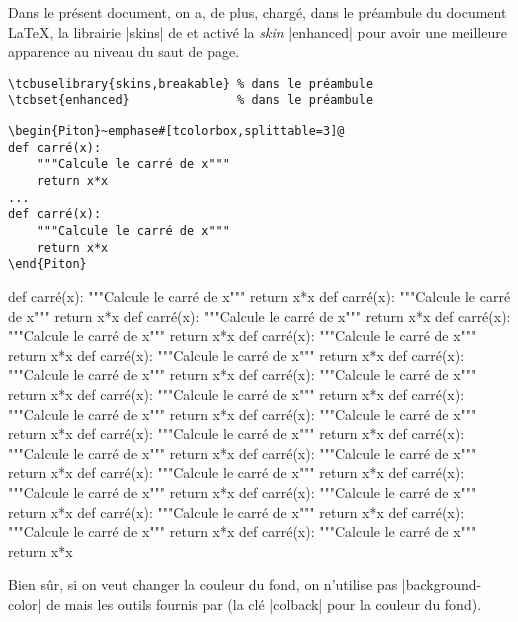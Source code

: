 \documentclass[dvipsnames,svgnames]{article}
\begin{document}
\bigskip
Dans le présent document, on a, de plus, chargé, dans le préambule du document LaTeX,
la librairie |skins| de  et activé la \emph{skin} |enhanced| pour avoir
une meilleure apparence au niveau du saut de page.

\begin{footnotesize}
\begin{Verbatim}
\tcbuselibrary{skins,breakable} % dans le préambule
\tcbset{enhanced}               % dans le préambule
\end{Verbatim}
\end{footnotesize}

\smallskip
\begin{Verbatim}
\begin{Piton}~emphase#[tcolorbox,splittable=3]@
def carré(x):
    """Calcule le carré de x"""
    return x*x
...
def carré(x):
    """Calcule le carré de x"""
    return x*x
\end{Piton}
\end{Verbatim}

\begin{Piton}[tcolorbox,splittable=3]
def carré(x):
    """Calcule le carré de x"""
    return x*x
def carré(x):
    """Calcule le carré de x"""
    return x*x
def carré(x):
    """Calcule le carré de x"""
    return x*x
def carré(x):
    """Calcule le carré de x"""
    return x*x
def carré(x):
    """Calcule le carré de x"""
    return x*x
def carré(x):
    """Calcule le carré de x"""
    return x*x
def carré(x):
    """Calcule le carré de x"""
    return x*x
def carré(x):
    """Calcule le carré de x"""
    return x*x
def carré(x):
    """Calcule le carré de x"""
    return x*x
def carré(x):
    """Calcule le carré de x"""
    return x*x
def carré(x):
    """Calcule le carré de x"""
    return x*x
def carré(x):
    """Calcule le carré de x"""
    return x*x
def carré(x):
    """Calcule le carré de x"""
    return x*x
def carré(x):
    """Calcule le carré de x"""
    return x*x
def carré(x):
    """Calcule le carré de x"""
    return x*x
def carré(x):
    """Calcule le carré de x"""
    return x*x
def carré(x):
    """Calcule le carré de x"""
    return x*x
def carré(x):
    """Calcule le carré de x"""
    return x*x
def carré(x):
    """Calcule le carré de x"""
    return x*x
def carré(x):
    """Calcule le carré de x"""
    return x*x
\end{Piton}


Bien sûr, si on veut changer la couleur du fond, on n'utilise pas
|background-color| de  mais les outils fournis par 
(la clé |colback| pour la couleur du fond).
\end{document}
